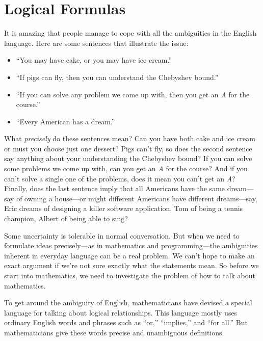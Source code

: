 \chapter{Logical Formulas}\label{logicform_chap}

It is amazing that people manage to cope with all the ambiguities in the
English language.  Here are some sentences that illustrate the issue:
%
\begin{itemize}
\item ``You may have cake, or you may have ice cream.''
\item ``If pigs can fly, then you can understand the Chebyshev bound.''
\item ``If you can solve any problem we come up with, then you get an
  \emph{A} for the course.''
\item ``Every American has a dream.''
\end{itemize}
%
What \emph{precisely} do these sentences mean?  Can you have both
cake and ice cream or must you choose just one dessert?  Pigs can't
fly, so does the second sentence say anything about your understanding
the Chebyshev bound? If you can solve some problems we come up with,
can you get an \emph{A} for the course?  And if you can't solve a
single one of the problems, does it mean you can't get an \emph{A}?
Finally, does the last sentence imply that all Americans have the same
dream---say of owning a house---or might different Americans have
different dreams---say, Eric dreams of designing a killer software
application, Tom of being a tennis champion, Albert of being able to
sing?

Some uncertainty is tolerable in normal conversation.  But when we need to
formulate ideas precisely---as in mathematics and programming---the
ambiguities inherent in everyday language can be a real problem.  We can't
hope to make an exact argument if we're not sure exactly what the
statements mean.  So before we start into mathematics, we need to
investigate the problem of how to talk about mathematics.

To get around the ambiguity of English, mathematicians have devised a
special language for talking about logical relationships.  This language
mostly uses ordinary English words and phrases such as ``or,''
``implies,'' and ``for all.''  But mathematicians give these words precise
and unambiguous definitions.  \iffalse A pitfall to watch out for is
confusing ordinary language with mathematical language that sounds
ordinary but isn't.\fi

